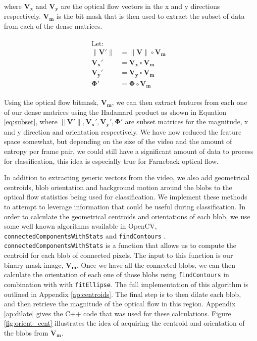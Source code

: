 where $\mathbf{V_x}$ and $\mathbf{V_y}$ are the optical flow vectors in the
x and y directions respectively. $\mathbf{V_m}$ is the bit mask that is
then used to extract the subset of data from each of the dense matrices.

\begin{align}
  \begin{split}
  \text{Let: } \\
  \|\mathbf{V\prime}\| &= \|\mathbf{V}\| \circ \mathbf{V_m}\\
  \mathbf{V_x\prime} &= \mathbf{V_x} \circ \mathbf{V_m}\\
  \mathbf{V_y\prime} &= \mathbf{V_y} \circ \mathbf{V_m}\\
  \mathbf{\Phi\prime} &= \mathbf{\Phi} \circ \mathbf{V_m}
\end{split}
\label{eq:subset}
\end{align}

Using the optical flow bitmask, $\mathbf{V_m}$, we can then extract features
from each one of our dense matrices using the Hadamard product as shown in
Equation \ref{eq:subset}, where $\|\mathbf{V\prime}\|,
\mathbf{V_x\prime},\mathbf{V_y\prime}, \mathbf{\Phi\prime}$ are subset matrices
for the magnitude, x and y direction and orientation respectively. We have now
reduced the feature space somewhat, but depending on the size of the video and the
amount of entropy per frame pair, we could still have a significant amount of
data to process for classification, this idea is especially true for
Farneback optical flow.

In addition to extracting generic vectors from the video, we also add
geometrical centroids, blob orientation and background motion around the blobs
to the optical flow statistics being used for classification. We implement these
methods to attempt to leverage information that could be useful during
classification. In order to calculate the geometrical centroids and orientations
of each blob, we use some well known algorithms available in OpenCV,
\texttt{connectedComponentsWithStats} and \texttt{findContours}
\cite{itseez2015opencv}. \texttt{connectedComponentsWithStats} is a function
that allows us to compute the centroid for each blob of connected pixels. The
input to this function is our binary mask image, $\mathbf{V_m}$. Once we have
all the connected blobs, we can then calculate the orientation of each one of
those blobs using \texttt{findContours} in combination with with
\texttt{fitEllipse}. The full implementation of this algorithm is outlined in
Appendix \ref{ap:centroids}. The final step is to then dilate each blob, and
then retrieve the magnitude of the optical flow in this region. Appendix
\ref{ap:dilate} gives the C++ code that was used for these calculations.
Figure \ref{fig:orient_cent} illustrates the idea of acquiring
the centroid and orientation of the blobs from $\mathbf{V_m}$.

